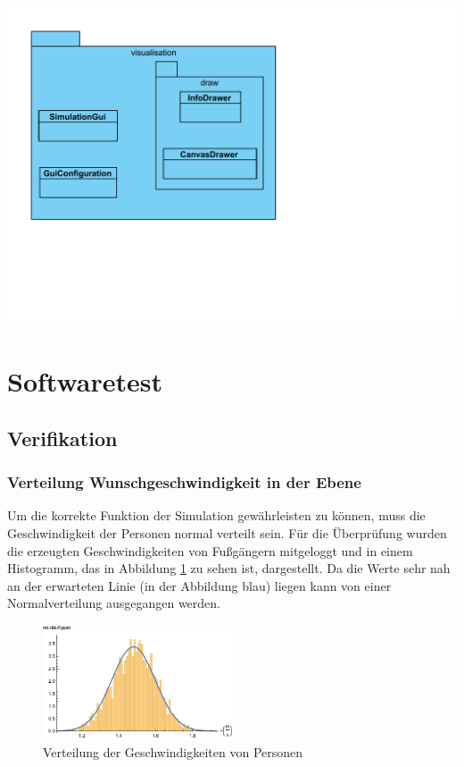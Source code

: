 \includegraphics[width=\textwidth]{abbildungen/uml/visualisation}

\newpage
\section{Softwaretest}



\newpage
\subsection{Verifikation}

\subsubsection{Verteilung Wunschgeschwindigkeit in der Ebene}
Um die korrekte Funktion der Simulation gewährleisten zu können, muss die Geschwindigkeit der Personen normal verteilt sein. Für die Überprüfung wurden die erzeugten Geschwindigkeiten von Fußgängern mitgeloggt und in einem Histogramm, das in Abbildung \ref{fig:Verteilung_Geschwindigkeit} zu sehen ist, dargestellt. Da die Werte sehr nah an der erwarteten Linie (in der Abbildung blau) liegen kann von einer Normalverteilung ausgegangen werden.

\begin{figure}[htpb]
	\centering
	\includegraphics[width=0.5\textwidth]{abbildungen/histogramm.pdf}
	\caption{Verteilung der Geschwindigkeiten von Personen}
	\label{fig:Verteilung_Geschwindigkeit}
\end{figure}  

